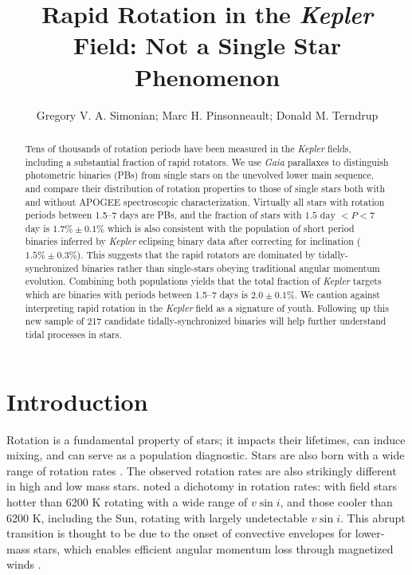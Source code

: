 \documentclass[manuscript]{aastex6}
\newcommand{\vsini}{\ensuremath{v \sin i}}
\newcommand{\Kepler}{\mbox{\textit{Kepler}}}
\newcommand{\Gaia}{\mbox{\textit{Gaia}}}
\begin{document}
\title{Rapid Rotation in the \Kepler{} Field: Not a Single Star
Phenomenon}
\author{Gregory V. A. Simonian; Marc H. Pinsonneault; Donald M. Terndrup}

\begin{abstract}
    Tens of thousands of rotation periods have been measured in the
    \Kepler{} fields, including a substantial fraction of rapid rotators. We 
    use \Gaia{} parallaxes to distinguish photometric binaries (PBs) from
    single stars on the unevolved lower main sequence, and compare their
    distribution of rotation properties to those of single stars both with and 
    without APOGEE spectroscopic characterization. Virtually all stars 
    with rotation periods between 1.5--7 days are PBs, and the fraction of stars
    with \(1.5 \textrm{ day } < P < 7\) day is \(1.7\% \pm 0.1\%\) which
    is also consistent with the population of short period binaries inferred 
    by \Kepler{} eclipsing binary data after correcting for inclination
    (\(1.5\% \pm 0.3\%\)). This suggests that the rapid rotators 
    are dominated by tidally-synchronized binaries rather than single-stars 
    obeying traditional angular momentum evolution. Combining both populations
    yields that the total fraction of \Kepler{} targets which are binaries with 
    periods between 1.5--7 days is \(2.0 \pm 0.1\%\). We caution against 
    interpreting rapid rotation in the \Kepler{} field as a signature of youth. 
    Following up this new sample of 217 candidate tidally-synchronized binaries 
    will help further understand tidal processes in stars.
\end{abstract}

\section{Introduction}

Rotation is a fundamental property of stars; it impacts their lifetimes, can
induce mixing, and can serve as a population diagnostic. Stars are also born 
with a wide range of rotation rates \citep{Attridge92, Herbst00, Henderson12}.
The observed rotation rates are also strikingly different in high and low mass 
stars. \citet{Kraft67} noted a dichotomy in rotation rates: with field stars 
hotter than 6200 K rotating with a wide range of \vsini, and those cooler than 
6200 K, including the Sun, rotating with largely undetectable \vsini. This abrupt transition is thought to
be due to the onset of convective envelopes for lower-mass stars, which 
enables efficient angular momentum loss through magnetized winds 
\citep{Parker58,Weber67}.
\end{document}
